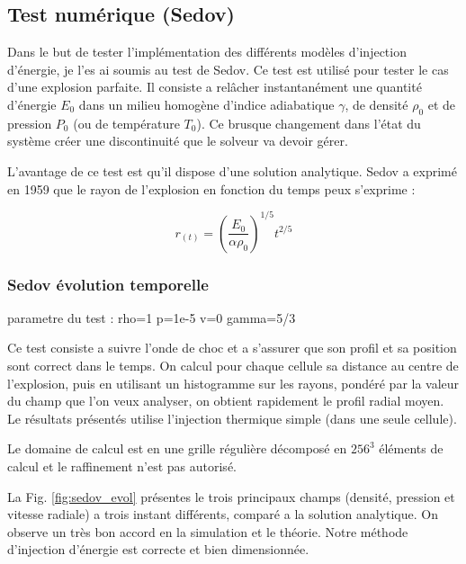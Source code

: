 \subsection{Test numérique (Sedov)}


Dans le but de tester l'implémentation des différents modèles d'injection d'énergie, je l'es ai soumis au test de Sedov.
Ce test est utilisé pour tester le cas d'une explosion parfaite.
Il consiste a relâcher instantanément une quantité d'énergie $E_0$ dans un milieu homogène d'indice adiabatique $\gamma$, de densité $\rho_0$ et de pression $P_0$ (ou de température $T_0$).
Ce brusque changement dans l'état du système créer une discontinuité que le solveur va devoir gérer.

L'avantage de ce test est qu'il dispose d'une solution analytique.
Sedov a exprimé  en 1959 que le rayon de l'explosion en fonction du temps peux s'exprime : %

\begin{equation}
r_{(t)}=\left( \frac{E_0}{\alpha \rho_0 }\right)^{1/5} t^{2/5}
\end{equation}


\subsubsection{Sedov évolution temporelle }


parametre du test :
rho=1
p=1e-5
v=0
gamma=5/3


Ce test consiste a suivre l'onde de choc et a s'assurer que son profil et sa position sont correct dans le temps.
On calcul pour chaque cellule sa distance au centre de l'explosion, puis en utilisant un histogramme sur les rayons, pondéré par la valeur du champ que l'on veux analyser, on obtient rapidement le profil radial moyen.
Le résultats présentés utilise l'injection thermique simple (dans une seule cellule).

Le domaine de calcul est en une grille régulière décomposé en $256^3$ éléments  de calcul et le raffinement n'est pas autorisé.

La Fig. \ref{fig:sedov_evol} présentes le trois principaux champs (densité, pression et vitesse radiale) a trois instant différents, comparé a la solution analytique.
On observe un très bon accord en la simulation et le théorie.
Notre méthode d'injection d'énergie est correcte et bien dimensionnée.
%

